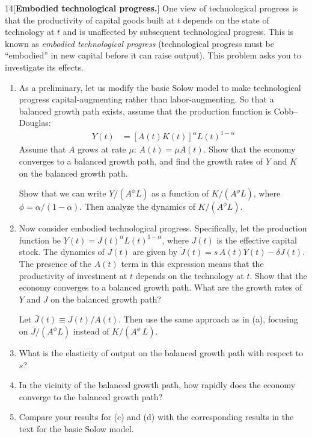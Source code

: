 \begin{problem}{14}[\textbf{Embodied technological progress.}]
One view of technological progress is that the
productivity of capital goods built at \(t\) depends on the state of technology at \(t\) and is
unaffected by subsequent technological progress. This is known as \emph{embodied technological
progress} (technological progress must be ``embodied'' in new capital before it can raise output).
This problem asks you to investigate its effects.
\begin{enumerate}[label=(\alph*)]
    \item As a preliminary, let us modify the basic Solow model to make technological progress
    capital-augmenting rather than labor-augmenting. So that a balanced growth path exists, assume
    that the production function is Cobb--Douglas:
    \begin{align*}
    Y\left(t\right)
    &=\left[A\left(t\right)K\left(t\right)\right]^{\alpha}L\left(t\right)^{1-\alpha}
    \end{align*}
    Assume that \(A\) grows at rate \(\mu\): \(\dot{A}\left(t\right)=\mu A\left(t\right)\).
    Show that the economy converges to a balanced growth path, and find the growth rates of \(Y\)
    and \(K\) on the balanced growth path.
    \par {} Show that we can write
    \(Y/\left(A^{\phi}L\right)\) as a function of \(K/\left(A^{\phi}L\right)\), where
    \(\phi=\alpha/\left(1-\alpha\right)\). Then analyze the dynamics of
    \(K/\left(A^{\phi}L\right)\).
    \item Now consider embodied technological progress. Specifically, let the production function be
    \(Y\left(t\right)=J\left(t\right)^{\alpha}L\left(t\right)^{1-\alpha}\), where \(J\left(t\right)\)
    is the effective capital stock. The dynamics of \(J\left(t\right)\) are given by
    \(\dot{J}\left(t\right)=s\,A\left(t\right)Y\left(t\right)-\delta J\left(t\right)\).
    The presence of the \(A\left(t\right)\) term in this expression means that the productivity
    of investment at \(t\) depends on the technology at \(t\). Show that the economy converges
    to a balanced growth path. What are the growth rates of \(Y\) and \(J\) on the balanced
    growth path?
    \par {} Let \(\bar{J}\left(t\right)\equiv J\left(t\right)/A\left(t\right)\). Then use the same approach as in (a), focusing on \(\bar{J}/\left(A^{\phi}L\right)\) instead of \(K/\left(A^{\phi}\,L\right)\).
    \item What is the elasticity of output on the balanced growth path with respect to \(s\)?
    \item In the vicinity of the balanced growth path, how rapidly does the economy converge to the balanced growth path?
    \item Compare your results for (c) and (d) with the corresponding results in the text for
    the basic Solow model.
\end{enumerate}
\end{problem}

